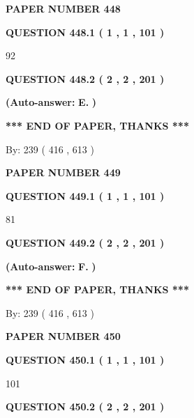 \documentclass[12pt]{article}
\begin{document}
   
\newpage 
\setcounter{page}{ 
   448001 } 
   
   
 {\textbf{ \Large{ PAPER NUMBER  448  }}}
   
   
   
   
  
  
{\textbf{\large{QUESTION
448.1 
 ( 1 , 1 , 101 )
}}}

92
  
  
{\textbf{\large{QUESTION
448.2 
 ( 2 , 2 , 201 )
}}}
 
 
{\textbf{(Auto-answer:}}
{\textbf{\large{
E.}}}
{\textbf{)}}
 
 
   
   
   
   
\vspace{1.0in} 
{\textbf{\large{ *** END OF PAPER, THANKS *** }}} 
   
   
\hspace{1.0in} By: 
 239 ( 416 ,  613 )
   
   
   
   
\newpage 
\setcounter{page}{ 
   449001 } 
   
   
 {\textbf{ \Large{ PAPER NUMBER  449  }}}
   
   
   
   
  
  
{\textbf{\large{QUESTION
449.1 
 ( 1 , 1 , 101 )
}}}

81
  
  
{\textbf{\large{QUESTION
449.2 
 ( 2 , 2 , 201 )
}}}
 
 
{\textbf{(Auto-answer:}}
{\textbf{\large{
F.}}}
{\textbf{)}}
 
 
   
   
   
   
\vspace{1.0in} 
{\textbf{\large{ *** END OF PAPER, THANKS *** }}} 
   
   
\hspace{1.0in} By: 
 239 ( 416 ,  613 )
   
   
   
   
\newpage 
\setcounter{page}{ 
   450001 } 
   
   
 {\textbf{ \Large{ PAPER NUMBER  450  }}}
   
   
   
   
  
  
{\textbf{\large{QUESTION
450.1 
 ( 1 , 1 , 101 )
}}}

101
  
  
{\textbf{\large{QUESTION
450.2 
 ( 2 , 2 , 201 )
}}}
 
\end{document}
